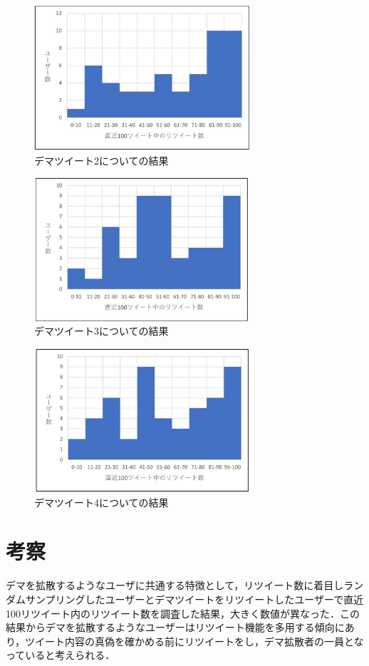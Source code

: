 \documentclass[uplatex,twocolumn]{jsarticle}
\begin{document}
\begin{figure}[htbp]
\centering
\includegraphics[clip,width=8.0cm]{d2.pdf}
\caption{デマツイート2についての結果}
\label{ヒストグラム2}
\end{figure}

\begin{figure}[htbp]
\centering
\includegraphics[clip,width=8.0cm]{d3.pdf}
\caption{デマツイート3についての結果}
\label{ヒストグラム3}
\end{figure}

\begin{figure}[htbp]
\centering
\includegraphics[clip,width=8.0cm]{d4.pdf}
\caption{デマツイート4についての結果}
\label{ヒストグラム4}
\end{figure}

\section{考察}
デマを拡散するようなユーザに共通する特徴として，リツイート数に着目しランダムサンプリングしたユーザーとデマツイートをリツイートしたユーザーで直近100リツイート内のリツイート数を調査した結果，大きく数値が異なった．この結果からデマを拡散するようなユーザーはリツイート機能を多用する傾向にあり，ツイート内容の真偽を確かめる前にリツイートをし，デマ拡散者の一員となっていると考えられる．
\end{document}
